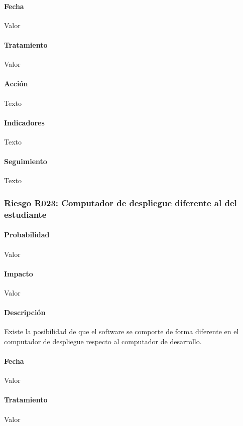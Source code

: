 \documentclass[10pt,a4paper]{article}
\begin{document}
				\paragraph{Fecha} Valor %
				\paragraph{Tratamiento} Valor %
				\paragraph{Acción} Texto %
				\paragraph{Indicadores} Texto %
				\paragraph{Seguimiento}	Texto %
				\subsubsection{Riesgo R023: Computador de despliegue diferente al del estudiante}
				\paragraph{Probabilidad} Valor
				\paragraph{Impacto}	Valor
				\paragraph{Descripción} Existe la posibilidad de que el software se comporte de forma diferente en el computador de despliegue respecto al computador de desarrollo.
				\paragraph{Fecha} Valor %
				\paragraph{Tratamiento} Valor %
\end{document}
